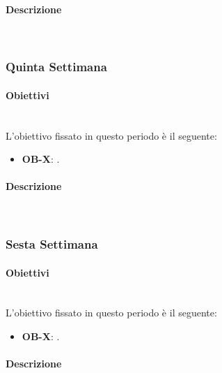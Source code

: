 {	    \paragraph*{Descrizione} \mbox{}\\ [1mm]
    	
    \subsubsection{Quinta Settimana}
    	\paragraph{}
    	\paragraph*{Obiettivi} \mbox{}\\ [1mm]
    	L'obiettivo fissato in questo periodo è il seguente:
        \begin{itemize}
            \item \textbf{OB-X}: .
        \end{itemize}
	    \paragraph*{Descrizione} \mbox{}\\ [1mm]
    	
     \subsubsection{Sesta Settimana}
     	\paragraph{}
     	\paragraph*{Obiettivi} \mbox{}\\ [1mm]
		L'obiettivo fissato in questo periodo è il seguente:
        \begin{itemize}
            \item \textbf{OB-X}: .
        \end{itemize}
	    \paragraph*{Descrizione} \mbox{}\\ [1mm]
    
}
